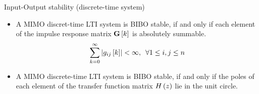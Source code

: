 \documentclass[aspectratio=169]{beamer}
\def\mf{\ensuremath\mathbf}
\def\lp{\ensuremath\left(}
\def\rp{\ensuremath\right)}
\def\lv{\ensuremath\left\lvert}
\def\rv{\ensuremath\right\rvert}
\def\ls{\ensuremath\left[}
\def\rs{\ensuremath\right]}
\newcommand{\ct}[1]{\lp #1\rp}
\newcommand{\dt}[1]{\ls #1\rs}
\begin{document}
\begin{frame}{Input-Output stability (discrete-time system)}
\begin{itemize}
    \item A MIMO discret-time LTI system is BIBO stable, if and only if each element of the impulse response matrix $\mf{G}\dt{k}$ is absolutely summable.
    \[ \sum_{k=0}^\infty \lv g_{ij}\dt{k}\rv < \infty , \,\,\, \forall 1 \leq i, j \leq n \]

    \item A MIMO discrete-time LTI system is BIBO stable, if and only if the poles of each element of the transfer function matrix $H\ct{z}$ lie in the unit circle.
\end{itemize}
\end{frame} 
\end{document}
